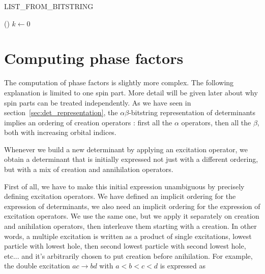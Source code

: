 \documentclass[./thesis.tex]{subfiles}
\begin{document}
\begin{algorithm}[h!]
	\caption{LIST\_FROM\_BITSTRING}
	\label{alg:LIST_FROM_BITSTRING}
	
	\Fn(){}{
		$k \gets 0$ \;
		}
		
\end{algorithm}



\section{Computing phase factors}



The computation of phase factors is slightly more complex. The following explanation is limited to one spin part. More detail will be given later about why spin parts can be treated independently.
As we have seen in section~\ref{sec:det_representation}, the $\alpha \beta$-bitstring representation of determinants implies an ordering of creation operators : first all the $\alpha$ operators, then all the $\beta$, both with increasing orbital indices.

Whenever we build a new determinant by applying an excitation operator, we obtain a determinant that is initially expressed not just with a different ordering, but with a mix of creation and annihilation operators.

First of all, we have to make this initial expression unambiguous by precisely defining excitation operators. We have defined an implicit ordering for the expression of determinants, we also need an implicit ordering for the expression of excitation operators. We use the same one, but we apply it separately on creation and anihilation operators, then interleave them starting with a creation. In other words, a multiple excitation is written as a product of single excitations, lowest particle with lowest hole, then second lowest particle with second lowest hole, etc... and it's arbitrarily chosen to put creation before anihilation.
For example, the double excitation $ac \rightarrow bd$ with $a<b<c<d$ is expressed as
\end{document}
